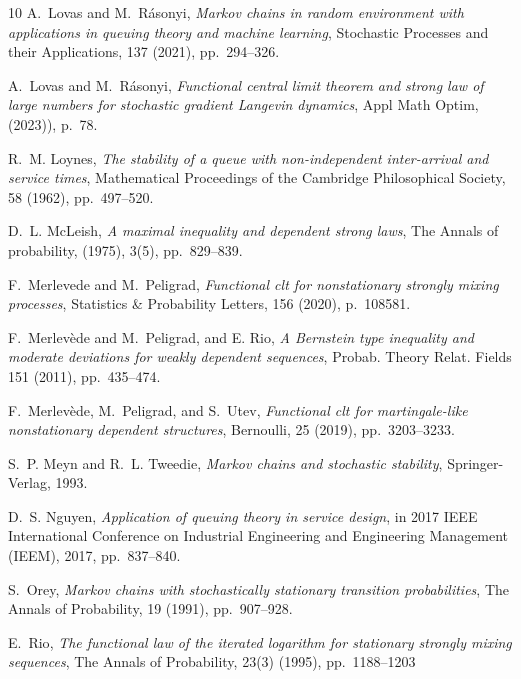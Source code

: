 \documentclass[a4paper,10pt]{article}
\begin{document}
\begin{thebibliography}{10}
	{\sc A.~Lovas and M.~R{\'a}sonyi}, {\em {M}arkov chains in random environment
		with applications in queuing theory and machine learning}, Stochastic
	Processes and their Applications, 137 (2021), pp.~294--326.
	
	{\sc A.~Lovas and M.~R\'asonyi}, {\em Functional central limit theorem and
		strong law of large numbers for stochastic gradient {L}angevin dynamics},
	Appl Math Optim,  (2023)), p.~78.
	
	{\sc R.~M. Loynes}, {\em The stability of a queue with non-independent
		inter-arrival and service times}, Mathematical Proceedings of the Cambridge
	Philosophical Society, 58 (1962), pp.~497--520.
	
	{\sc D.~L. McLeish}, {\em A maximal inequality and dependent strong laws}, The Annals of probability, (1975), 3(5), pp.~829--839.
	
	{\sc F.~Merlevede and M.~Peligrad}, {\em Functional clt for nonstationary
		strongly mixing processes}, Statistics \& Probability Letters, 156 (2020),
	p.~108581.
	
	{\sc F.~Merlev{\`e}de and M.~Peligrad, and E. Rio}, {\em A Bernstein type inequality and moderate deviations for weakly dependent sequences}, Probab. Theory Relat. Fields 151 (2011), pp.~435--474.
	
	{\sc F.~Merlev{\`e}de, M.~Peligrad, and S.~Utev}, {\em Functional clt for
		martingale-like nonstationary dependent structures}, Bernoulli, 25 (2019),
	pp.~3203--3233.
	
	{\sc S.~P. Meyn and R.~L. Tweedie}, {\em {M}arkov chains and stochastic
		stability}, Springer-Verlag, 1993.
	
	{\sc D.~S. Nguyen}, {\em Application of queuing theory in service design}, in
	2017 IEEE International Conference on Industrial Engineering and Engineering
	Management (IEEM), 2017, pp.~837--840.
	
	{\sc S.~Orey}, {\em Markov chains with stochastically stationary transition
		probabilities}, The Annals of Probability, 19 (1991), pp.~907--928.
	

	{\sc E.~Rio}, {\em The functional law of the iterated logarithm for stationary strongly mixing sequences}, The Annals of Probability, 23(3) (1995), pp.~1188--1203
	

\end{thebibliography}
\end{document}

